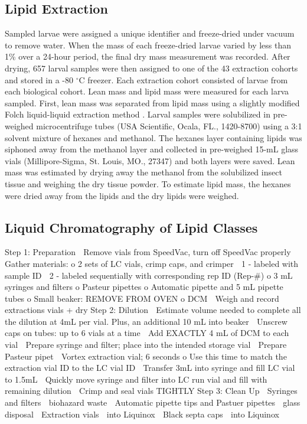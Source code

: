 \documentclass[review]{elsarticle}
\begin{document}
\subsection{Lipid Extraction}
Sampled larvae were assigned a unique identifier and freeze-dried under vacuum to remove water. When the mass of each freeze-dried larvae varied by less than 1\% over a 24-hour period, the final dry mass measurement was recorded. After drying, 657 larval samples were then assigned to one of the 43 extraction cohorts and stored in a -80 $^\circ$C freezer. Each extraction cohort consisted of larvae from each biological cohort. Lean mass and lipid mass were measured for each larva sampled. First, lean mass was separated from lipid mass using a slightly modified Folch liquid-liquid extraction method \citep{FOLCH1957}. Larval samples were solubilized in pre-weighed microcentrifuge tubes (USA Scientific, Ocala, FL., 1420-8700) using a 3:1 solvent mixture of hexanes and methanol. The hexanes layer containing lipids was siphoned away from the methanol layer and collected in pre-weighed 15-mL glass vials (Millipore-Sigma, St. Louis, MO., 27347) and both layers were saved. Lean mass was estimated by drying away the methanol from the solubilized insect tissue and weighing the dry tissue powder. To estimate lipid mass, the hexanes were dried away from the lipids and the dry lipids were weighed. 

\subsection{Liquid Chromatography of Lipid Classes}
Step 1: Preparation
	Remove vials from SpeedVac, turn off SpeedVac properly
	Gather materials:
o	2 sets of LC vials, crimp caps, and crimper
	1 - labeled with sample ID
	2 - labeled sequentially with corresponding rep ID (Rep-#)
o	3 mL syringes and filters
o	Pasteur pipettes
o	Automatic pipette and 5 mL pipette tubes
o	Small beaker: REMOVE FROM OVEN
o	DCM
	Weigh and record extractions vials + dry
Step 2: Dilution
	Estimate volume needed to complete all the dilution at 4mL per vial. Plus, an additional 10 mL into beaker
	Unscrew caps on tubes: up to 6 vials at a time
	Add EXACTLY 4 mL of DCM to each vial
	Prepare syringe and filter; place into the intended storage vial
	Prepare Pasteur pipet
	Vortex extraction vial; 6 seconds 
o	Use this time to match the extraction vial ID to the LC vial ID
	Transfer 3mL into syringe and fill LC vial to 1.5mL
	Quickly move syringe and filter into LC run vial and fill with remaining dilution
	Crimp and seal vials TIGHTLY
Step 3: Clean Up
	Syringes and filters  biohazard waste
	Automatic pipette tips and Pastuer pipettes  glass disposal
	Extraction vials  into Liquinox
	Black septa caps  into Liquinox
\end{document}
